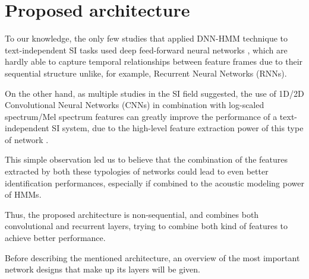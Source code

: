 \section{Proposed architecture}\label{sec:architecture}
To our knowledge, the only few studies that applied DNN-HMM technique to text-independent SI tasks used deep feed-forward neural networks \cite{si:dnnhmm}, which are hardly able to capture temporal relationships between feature frames due to their sequential structure unlike, for example, Recurrent Neural Networks (RNNs).

On the other hand, as multiple studies in the SI field suggested, the use of 1D/2D Convolutional Neural Networks (CNNs) in combination with log-scaled spectrum/Mel spectrum features can greatly improve the performance of a text-independent SI system, due to the high-level feature extraction power of this type of network \cite{si:lstm}.

This simple observation led us to believe that the combination of the features extracted by both these typologies of networks could lead to even better identification performances, especially if combined to the acoustic modeling power of HMMs.

Thus, the proposed architecture is non-sequential, and combines both convolutional and recurrent layers, trying to combine both kind of features to achieve better performance.

Before describing the mentioned architecture, an overview of the most important network designs that make up its layers will be given.








	